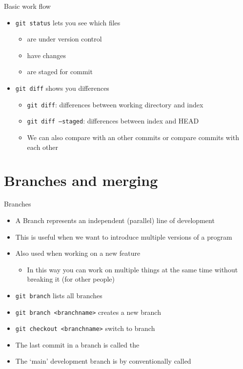 \documentclass[12pt]{beamer}
\begin{document}
\begin{frame}[fragile]{Basic work flow}
\begin{itemize}
\item \texttt{git status} lets you see which files
\begin{itemize}
\item are under version control
\item have changes
\item are staged for commit
\end{itemize}
\item \texttt{git diff} shows you differences
\begin{itemize}
\item \texttt{git diff}: differences between working directory and index
\item \texttt{git diff --staged}: differences between index and HEAD
\item We can also compare with an other commits or compare commits with each other
\end{itemize}

\end{itemize}
\end{frame}

\section{Branches and merging}

\begin{frame}[fragile]{Branches}
\begin{itemize}
\item A Branch represents an independent (parallel) line of development
\item This is useful when we want to introduce multiple versions of a program
\item Also used when working on a new feature
\begin{itemize}
\item In this way you can work on multiple things at the same time without breaking it (for other people)
\end{itemize}
\item \texttt{git branch} lists all branches
\item \texttt{git branch <branchname>} creates a new branch
\item \texttt{git checkout <branchname>} switch to branch
\item The last commit in a branch is called the \textbf{}
\item The `main' development branch is by conventionally called 
\end{itemize}

\end{frame}
\end{document}
